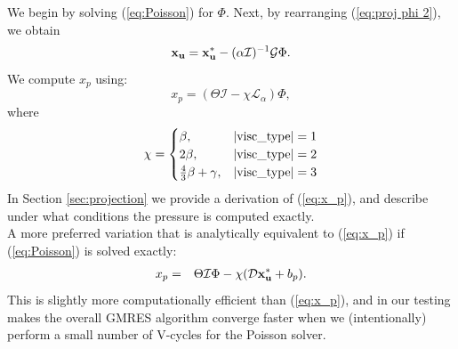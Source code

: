 \documentclass[final]{siamltex}
\def\ub {{\bf u}}
\def\xb {{\bf x}}
\begin{document}
\begin{itemize}
We begin by solving (\ref{eq:Poisson}) for $\Phi$.  Next, 
by rearranging (\ref{eq:proj phi 2}), we obtain
\begin{equation}
\xb_{\ub} = \xb_{\ub}^* - (\alpha\mathcal{I})^{-1}\mathcal{G}\Phi.\label{eq:x_b update}
\end{equation}
We compute $x_p$ using:
\begin{equation}
x_p = (\Theta\mathcal{I} - \chi\mathcal{L}_\alpha)\Phi,\label{eq:x_p}
\end{equation}
where
\begin{equation}
\chi =
\begin{cases}
\beta, & {\rm |visc\_type|} = 1\\
2\beta, & {\rm |visc\_type|} = 2\\
\frac{4}{3}\beta + \gamma, & {\rm |visc\_type|} = 3
\end{cases}
\end{equation}
In Section \ref{sec:projection} we provide a derivation of (\ref{eq:x_p}),
and describe under what conditions the pressure is computed exactly.\\

A more preferred variation that is analytically equivalent
to (\ref{eq:x_p}) if (\ref{eq:Poisson}) is solved exactly:
\begin{eqnarray}
x_p &=& \Theta\mathcal{I}\Phi - \chi(\mathcal{D}\xb_\ub^* + b_p).
\end{eqnarray}
This is slightly more computationally efficient than (\ref{eq:x_p}),
and in our testing makes the overall
GMRES algorithm converge faster when we (intentionally) perform a small
number of V-cycles for the Poisson solver.\\

\end{itemize}
\end{document}
